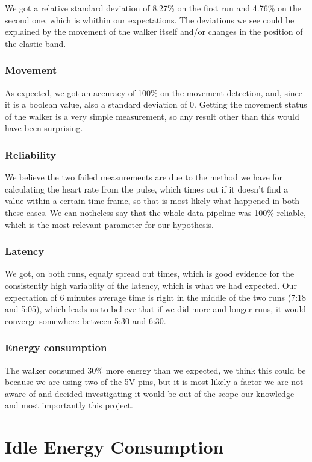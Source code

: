 			We got a relative standard deviation of 8.27\% on the first run and 4.76\% on the second one, which is whithin our expectations. The deviations we see could be explained by the movement of the walker itself and/or changes in the position of the elastic band.

		\subsubsection{Movement}
			As expected, we got an accuracy of 100\% on the movement detection, and, since it is a boolean value, also a standard deviation of 0. Getting the movement status of the walker is a very simple measurement, so any result other than this would have been surprising.

		\subsubsection{Reliability}
			We believe the two failed measurements are due to the method we have for calculating the heart rate from the pulse, which times out if it doesn't find a value within a certain time frame, so that is most likely what happened in both these cases. We can notheless say that the whole data pipeline was 100\% reliable, which is the most relevant parameter for our hypothesis.

		\subsubsection{Latency}
			We got, on both runs, equaly spread out times, which is good evidence for the consistently high variablity of the latency, which is what we had expected. Our expectation of 6 minutes average time is right in the middle of the two runs (7:18 and 5:05), which leads us to believe that if we did more and longer runs, it would converge somewhere between 5:30 and 6:30.

		\subsubsection{Energy consumption}
			The walker consumed 30\% more energy than we expected, we think this could be because we are using two of the 5V pins, but it is most likely a factor we are not aware of and decided investigating it would be out of the scope our knowledge and most importantly this project.

\section{Idle Energy Consumption}

